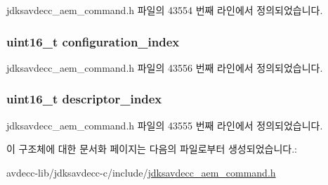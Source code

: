 jdksavdecc\+\_\+aem\+\_\+command.\+h 파일의 43554 번째 라인에서 정의되었습니다.

\subsubsection[{\texorpdfstring{configuration\+\_\+index}{configuration_index}}]{\setlength{\rightskip}{0pt plus 5cm}uint16\+\_\+t configuration\+\_\+index}\hypertarget{structjdksavdecc__aem__command__get__memory__object__length_afaad1bd7c66f9611e134d8c5ce98f444}{}\label{structjdksavdecc__aem__command__get__memory__object__length_afaad1bd7c66f9611e134d8c5ce98f444}


jdksavdecc\+\_\+aem\+\_\+command.\+h 파일의 43556 번째 라인에서 정의되었습니다.

\subsubsection[{\texorpdfstring{descriptor\+\_\+index}{descriptor_index}}]{\setlength{\rightskip}{0pt plus 5cm}uint16\+\_\+t descriptor\+\_\+index}\hypertarget{structjdksavdecc__aem__command__get__memory__object__length_a042bbc76d835b82d27c1932431ee38d4}{}\label{structjdksavdecc__aem__command__get__memory__object__length_a042bbc76d835b82d27c1932431ee38d4}


jdksavdecc\+\_\+aem\+\_\+command.\+h 파일의 43555 번째 라인에서 정의되었습니다.



이 구조체에 대한 문서화 페이지는 다음의 파일로부터 생성되었습니다.\+:\begin{DoxyCompactItemize}
\item 
avdecc-\/lib/jdksavdecc-\/c/include/\hyperlink{jdksavdecc__aem__command_8h}{jdksavdecc\+\_\+aem\+\_\+command.\+h}\end{DoxyCompactItemize}
